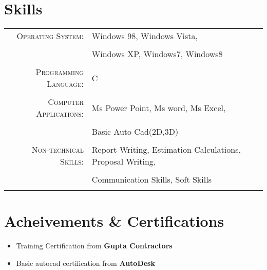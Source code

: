 \documentclass[a4paper,10pt]{article}
\begin{document}
\section{Skills}
\begin{tabular}{rl}	
\textsc{Operating System:}  & Windows 98, Windows Vista,\\\\&Windows XP, Windows7, Windows8\\\\
\textsc{Programming Language:} & C\\\\
\textsc{Computer Applications:} &Ms Power Point, Ms word, Ms Excel,\\\\& Basic Auto Cad(2D,3D)   \\\\
\textsc{Non-technical Skills:} &Report Writing, Estimation Calculations, Proposal Writing, \\\\& Communication Skills, Soft Skills\\\\			 
\end{tabular}

\section{Acheivements \& Certifications}
\begin{itemize}
\item Training Certification from \textbf{Gupta Contractors}
\item Basic autocad certification from \textbf{AutoDesk}
\end{itemize}
\end{document}
